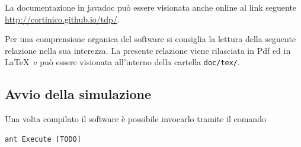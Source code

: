 \documentclass[a4paper,12pt]{article}
\begin{document}
La documentazione in javadoc pu\`o essere visionata anche online al link seguente \url{http://cortinico.github.io/tdp/}.

Per una comprensione organica del software si consiglia la lettura della seguente relazione nella sua interezza. La presente relazione viene rilasciata in Pdf ed in \LaTeX\ e pu\`o essere visionata all'interno della cartella \texttt{doc/tex/}.

\subsection{Avvio della simulazione}

Una volta compilato il software \`e possibile invocarlo tramite il comando
\begin{lstlisting}[basicstyle=\ttfamily]
ant Execute [TODO]
\end{lstlisting}
\end{document}
